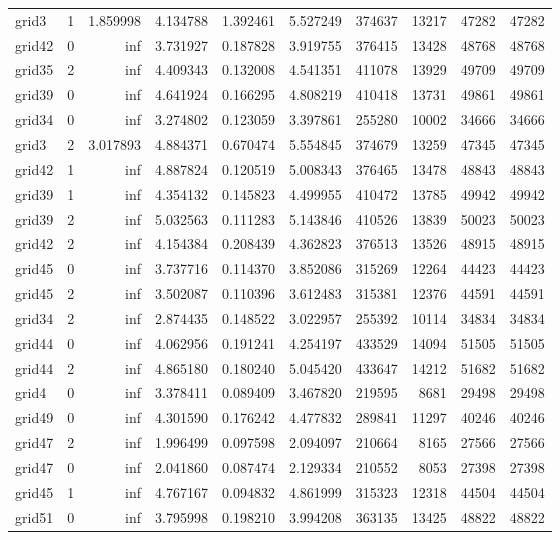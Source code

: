 \begin{longtable}{|l|r|r|r|r|r|r|r|r|r|}
grid3 & 1 & 1.859998 & 4.134788 & 1.392461 & 5.527249 & 374637 & 13217 & 47282 & 47282 \\
grid42 & 0 & inf & 3.731927 & 0.187828 & 3.919755 & 376415 & 13428 & 48768 & 48768 \\
grid35 & 2 & inf & 4.409343 & 0.132008 & 4.541351 & 411078 & 13929 & 49709 & 49709 \\
grid39 & 0 & inf & 4.641924 & 0.166295 & 4.808219 & 410418 & 13731 & 49861 & 49861 \\
grid34 & 0 & inf & 3.274802 & 0.123059 & 3.397861 & 255280 & 10002 & 34666 & 34666 \\
grid3 & 2 & 3.017893 & 4.884371 & 0.670474 & 5.554845 & 374679 & 13259 & 47345 & 47345 \\
grid42 & 1 & inf & 4.887824 & 0.120519 & 5.008343 & 376465 & 13478 & 48843 & 48843 \\
grid39 & 1 & inf & 4.354132 & 0.145823 & 4.499955 & 410472 & 13785 & 49942 & 49942 \\
grid39 & 2 & inf & 5.032563 & 0.111283 & 5.143846 & 410526 & 13839 & 50023 & 50023 \\
grid42 & 2 & inf & 4.154384 & 0.208439 & 4.362823 & 376513 & 13526 & 48915 & 48915 \\
grid45 & 0 & inf & 3.737716 & 0.114370 & 3.852086 & 315269 & 12264 & 44423 & 44423 \\
grid45 & 2 & inf & 3.502087 & 0.110396 & 3.612483 & 315381 & 12376 & 44591 & 44591 \\
grid34 & 2 & inf & 2.874435 & 0.148522 & 3.022957 & 255392 & 10114 & 34834 & 34834 \\
grid44 & 0 & inf & 4.062956 & 0.191241 & 4.254197 & 433529 & 14094 & 51505 & 51505 \\
grid44 & 2 & inf & 4.865180 & 0.180240 & 5.045420 & 433647 & 14212 & 51682 & 51682 \\
grid4 & 0 & inf & 3.378411 & 0.089409 & 3.467820 & 219595 & 8681 & 29498 & 29498 \\
grid49 & 0 & inf & 4.301590 & 0.176242 & 4.477832 & 289841 & 11297 & 40246 & 40246 \\
grid47 & 2 & inf & 1.996499 & 0.097598 & 2.094097 & 210664 & 8165 & 27566 & 27566 \\
grid47 & 0 & inf & 2.041860 & 0.087474 & 2.129334 & 210552 & 8053 & 27398 & 27398 \\
grid45 & 1 & inf & 4.767167 & 0.094832 & 4.861999 & 315323 & 12318 & 44504 & 44504 \\
grid51 & 0 & inf & 3.795998 & 0.198210 & 3.994208 & 363135 & 13425 & 48822 & 48822 \\

\end{longtable}
